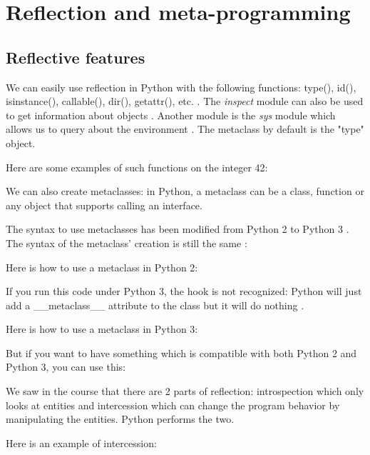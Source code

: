 \section{Reflection and meta-programming}
\subsection{Reflective features}
\label{reflection}
We can easily use reflection in Python with the following functions: type(), id(), isinstance(), callable(), dir(), getattr(), etc. \cite{python_doc_functions}.
The \textit{inspect} module can also be used to get information about objects \cite{python_doc_inspect}. Another module is the \textit{sys} module which allows us to query about the environment \cite{zetcode_introspection}.
The metaclass by default is the "type" object.

Here are some examples of such functions on the integer 42:


We can also create metaclasses: in Python, a metaclass can be a class, function or any object that supports calling an interface.

The syntax to use metaclasses has been modified from Python 2 to Python 3 \cite{mikewatkins_metaclasses}. The syntax of the metaclass' creation is still the same \cite{python_doc_datamodel}:


Here is how to use a metaclass in Python 2:

If you run this code under Python 3, the hook is not recognized: Python will just add a \_\_metaclass\_\_ attribute to the class but it will do nothing \cite{artima_metaclasses_1of2}.
\newline

Here is how to use a metaclass in Python 3:


But if you want to have something which is compatible with both Python 2 and Python 3, you can use this:


We saw in the course that there are 2 parts of reflection: introspection which only looks at entities and intercession which can change the program behavior by manipulating the entities. %
Python performs the two.
\newline

Here is an example of intercession:



